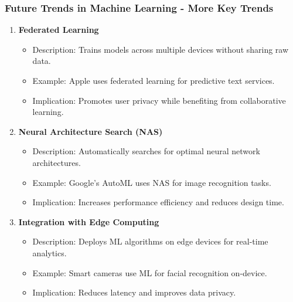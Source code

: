 \documentclass{beamer}
\begin{document}
\begin{frame}[fragile]
    \frametitle{Future Trends in Machine Learning - More Key Trends}
    \begin{enumerate}[resume]
        \item \textbf{Federated Learning}
        \begin{itemize}
            \item Description: Trains models across multiple devices without sharing raw data.
            \item Example: Apple uses federated learning for predictive text services.
            \item Implication: Promotes user privacy while benefiting from collaborative learning.
        \end{itemize}

        \item \textbf{Neural Architecture Search (NAS)}
        \begin{itemize}
            \item Description: Automatically searches for optimal neural network architectures.
            \item Example: Google’s AutoML uses NAS for image recognition tasks.
            \item Implication: Increases performance efficiency and reduces design time.
        \end{itemize}

        \item \textbf{Integration with Edge Computing}
        \begin{itemize}
            \item Description: Deploys ML algorithms on edge devices for real-time analytics.
            \item Example: Smart cameras use ML for facial recognition on-device.
            \item Implication: Reduces latency and improves data privacy.
        \end{itemize}
    \end{enumerate}
\end{frame}
\end{document}
